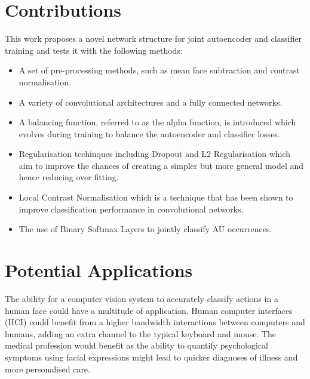   \section{Contributions}
    This work proposes a novel network structure for joint autoencoder and classifier training and tests it with
    the following methods:
    \begin{itemize}
      \item A set of pre-processing methods, such as mean face subtraction and contrast normalisation.

      \item A variety of convolutional architectures and a fully connected networks.

      \item A balancing function, referred to as the alpha function, is introduced which evolves during
            training to balance the autoencoder and classifier losses.

      \item Regularisation techinques including Dropout\cite{Srivastava2014} and L2 Regularisation\cite{Ng2004} which aim to improve the chances
            of creating a simpler but more general model and hence reducing over fitting.

      \item Local Contrast Normalisation\cite{Krizhevsky2012} which is a technique that has been shown to improve classification performance in convolutional networks.

      \item The use of Binary Softmax Layers to jointly classify AU occurrences.

    \end{itemize}

    \section{Potential Applications}
      The ability for a computer vision system to accurately classify actions in a
      human face could have a multitude of application. Human computer interfaces (HCI)
      could benefit from a higher bandwidth interactions between computers and humans, adding
      an extra channel to the typical keyboard and mouse. The medical profession would benefit
      as the ability to quantify psychological symptoms using facial expressions might lead to
      quicker diagnoses of illness and more personalised care.

